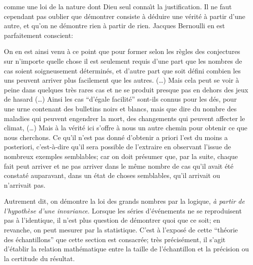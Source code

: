 comme une loi de la nature dont Dieu seul conna{\^\i}t la justification. 
Il ne faut cependant pas oublier que d\'emontrer consiste \`a d\'eduire 
une v\'erit\'e \`a partir d'une autre, et qu'on ne d\'emontre rien \`a 
partir de rien. Jacques Bernoulli en est parfaitement conscient: 
\smallskip 
{\cit On en est ainsi venu \`a ce point que pour former selon
les r\`egles des conjectures sur n'importe quelle chose il est
seulement requis d'une part que les nombres de cas soient 
soigneusement d\'etermin\'es, et d'autre part que soit d\'efini
combien les uns peuvent arriver plus facilement que les autres. (\dots ) 
Mais cela peut se voir \`a peine dans quelques tr\`es rares cas et ne se 
produit presque pas en dehors des jeux de hasard (\dots ) Ainsi les cas 
``d'\'egale facilit\'e'' sont-ils connus pour les d\'es, pour une urne 
contenant des bulletins noirs et blancs, mais que dire du nombre des 
maladies qui peuvent engendrer la mort, des changements qui peuvent 
affecter le climat, (\dots ) Mais \`a la v\'erit\'e ici s'offre \`a nous un 
autre chemin pour obtenir ce que nous cherchons. Ce qu'il n'est pas 
donn\'e d'obtenir a priori l'est du moins a posteriori, c'est-\`a-dire 
qu'il sera possible de l'extraire en observant l'issue de nombreux 
exemples semblables; car on doit pr\'esumer que, par la suite, chaque 
fait peut arriver et ne pas arriver dans le m\^eme nombre de cas qu'il 
avait \'et\'e constat\'e auparavant, dans un \'etat de choses 
semblables, qu'il arrivait ou n'arrivait pas. \par } 
\medskip 
Autrement dit, on d\'emontre la loi des grands nombres par la logique, 
{\it \`a partir de l'hypoth\`ese d'une invariance}. Lorsque les s\'eries 
d'\'ev\'enements ne se reproduisent pas \`a l'identique, il n'est plus 
question de d\'emontrer quoi que ce soit;  en revanche,  on peut mesurer
par la statistique.  
\medskip
C'est \`a l'expos\'e de cette ``th\'eorie des \'echantillons'' que cette 
section est consacr\'ee; tr\`es pr\'ecis\'ement, il s'agit d'\'etablir la
relation math\'ematique entre la taille de l'\'echantillon et la 
pr\'ecision ou la certitude du r\'esultat. 

\bigskip 


